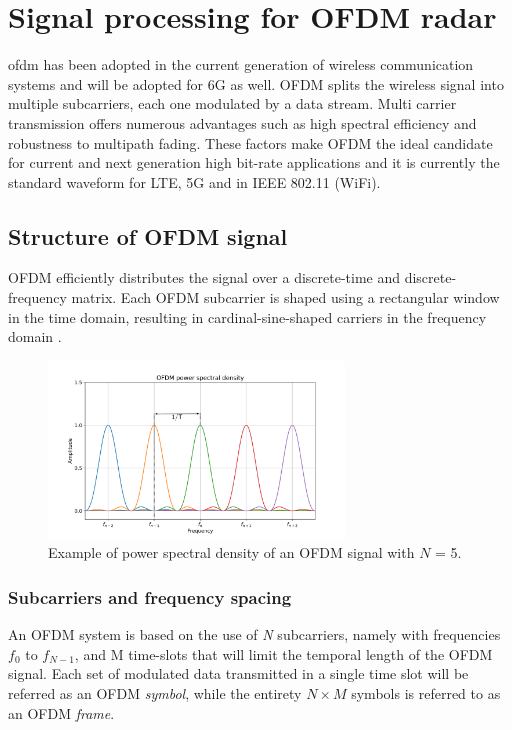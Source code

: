 \chapter{Signal processing for OFDM radar}
\label{chap:theoretical_OFDM}

\gls{ofdm} has been adopted in the current generation of wireless communication systems and will be adopted for 6G as well.
OFDM splits the wireless signal into multiple subcarriers, each one modulated by a data stream. Multi carrier transmission offers numerous advantages such as high spectral efficiency and robustness to multipath fading. These factors make OFDM the ideal candidate for current and next generation high bit-rate applications and it is currently the standard waveform for LTE, 5G and in IEEE 802.11 (WiFi).

\section{Structure of OFDM signal}

OFDM efficiently distributes the signal over a discrete-time and discrete-frequency matrix. Each OFDM subcarrier is shaped using a rectangular window in the time domain, resulting in cardinal-sine-shaped carriers in the frequency domain \cite{Schaich_Wild_2014}.

\begin{figure}[H]
    \centering
    \includegraphics[width=0.7\textwidth]{Images/theoretical/ofdm/ofdm_psd_mod.png}
    \caption{Example of power spectral density of an OFDM signal with $N$ = 5.}
    \label{fig:quadtree}
\end{figure}

\subsection{Subcarriers and frequency spacing}
An OFDM system is based on the use of \textit{N} subcarriers, namely with frequencies $f_0$ to $f_{N-1}$, and M time-slots that will limit the temporal length of the OFDM signal.
Each set of modulated data transmitted in a single time slot will be referred as an OFDM \textit{symbol}, while the entirety $N\times M$ symbols is referred to as an OFDM \textit{frame}.

